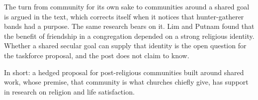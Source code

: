 \begin{afterword}
The turn from community for its own sake to communities around a shared goal is argued in the text, which corrects itself when it notices that hunter-gatherer bands had a purpose. The same research bears on it. Lim and Putnam found that the benefit of friendship in a congregation depended on a strong religious identity. Whether a shared secular goal can supply that identity is the open question for the taskforce proposal, and the post does not claim to know.

In short: a hedged proposal for post-religious communities built around shared work, whose premise, that community is what churches chiefly give, has support in research on religion and life satisfaction.
\end{afterword}
